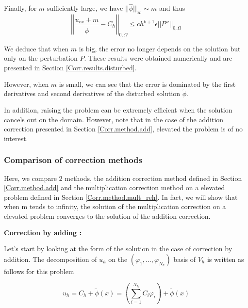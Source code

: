 Finally, for $m$ sufficiently large, we have $||\hat{\phi}||_\infty\sim m$ and thus
\begin{equation*}
	\left|\left|\frac{u_{ex}+m}{\hat{\phi}}-C_h\right|\right|_{0,\Omega}\le ch^{k+1}\epsilon\left|\left|P''\right|\right|_{0,\Omega}
\end{equation*}

We deduce that when $m$ is big, the error no longer depends on the solution but only on the perturbation $P$. These results were obtained numerically and are presented in Section \ref{Corr.results.disturbed}.

However, when $m$ is small, we can see that the error is dominated by the first derivatives and second derivatives of the disturbed solution $\tilde{\phi}$.

\begin{Rem}
	In addition, raising the problem can be extremely efficient when the solution cancels out on the domain. However, note that in the case of the addition correction presented in Section \ref{Corr.method.add}, elevated the problem is of no interest.
\end{Rem}

\subsubsection{Comparison of correction methods} \label{Corr.theo_results.comp_add_reh}

Here, we compare 2 methods, the addition correction method defined in Section \ref{Corr.method.add} and the multiplication correction method on a elevated problem defined in Section \ref{Corr.method.mult_reh}. In fact, we will show that when m tends to infinity, the solution of the multiplication correction on a elevated problem converges to the solution of the addition correction.

\textbf{Correction by adding :}

Let's start by looking at the form of the solution in the case of correction by addition. The decomposition of $u_h$ on the $(\varphi_1,\dots,\varphi_{N_h})$ basis of $V_h$ is written as follows for this problem

\begin{equation}
	u_h=C_h+\tilde{\phi}(x)=\left(\sum_{i=1}^{N_h}C_i\varphi_i\right)+\tilde{\phi}(x) \label{decomp_pbc2}
\end{equation}

